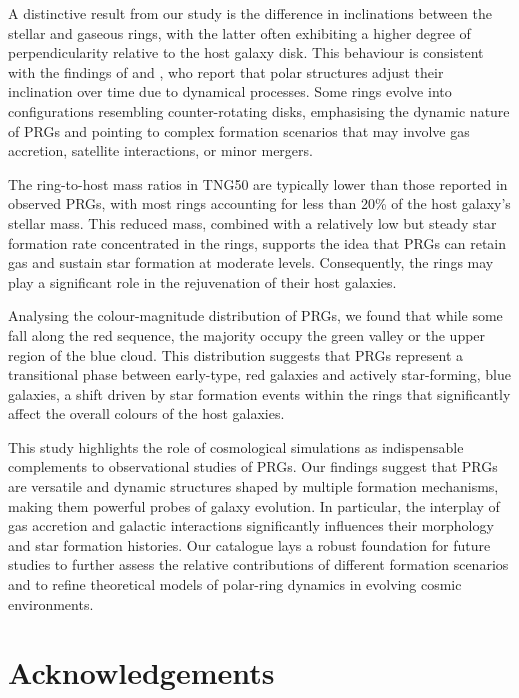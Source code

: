 \documentclass[fleqn,usenatbib]{mnras}
\begin{document}
A distinctive result from our study is the difference in inclinations between the stellar and gaseous rings, with the latter often exhibiting a higher degree of perpendicularity relative to the host galaxy disk. This behaviour is consistent with the findings of \citet{2023_Smirnov} and \citet{2020_Khoperskov}, who report that polar structures adjust their inclination over time due to dynamical processes. Some rings evolve into configurations resembling counter-rotating disks, emphasising the dynamic nature of PRGs and pointing to complex formation scenarios that may involve gas accretion, satellite interactions, or minor mergers.

The ring-to-host mass ratios in TNG50 are typically lower than those reported in observed PRGs, with most rings accounting for less than 20\% of the host galaxy's stellar mass. This reduced mass, combined with a relatively low but steady star formation rate concentrated in the rings, supports the idea that PRGs can retain gas and sustain star formation at moderate levels. Consequently, the rings may play a significant role in the rejuvenation of their host galaxies.

Analysing the colour-magnitude distribution of PRGs, we found that while some fall along the red sequence, the majority occupy the green valley or the upper region of the blue cloud. This distribution suggests that PRGs represent a transitional phase between early-type, red galaxies and actively star-forming, blue galaxies, a shift driven by star formation events within the rings that significantly affect the overall colours of the host galaxies.

This study highlights the role of cosmological simulations as indispensable complements to observational studies of PRGs. Our findings suggest that PRGs are versatile and dynamic structures shaped by multiple formation mechanisms, making them powerful probes of galaxy evolution. In particular, the interplay of gas accretion and galactic interactions significantly influences their morphology and star formation histories. Our catalogue lays a robust foundation for future studies to further assess the relative contributions of different formation scenarios and to refine theoretical models of polar-ring dynamics in evolving cosmic environments.


\section*{Acknowledgements}
\end{document}
